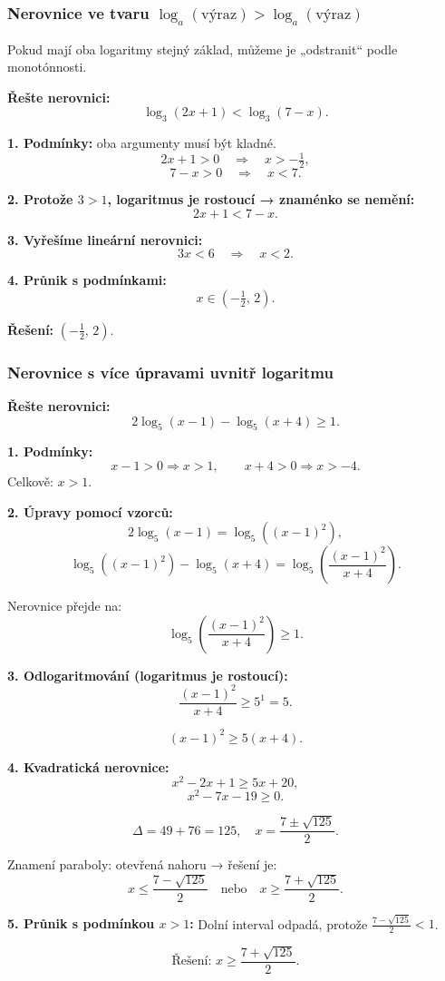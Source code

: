 \documentclass[12pt,a4paper]{article}
\begin{document}
\subsubsection*{Nerovnice ve tvaru $\log_a(\text{výraz}) > \log_a(\text{výraz})$}

Pokud mají oba logaritmy stejný základ, můžeme je „odstranit“ podle monotónnosti.

\begin{examplebox}
\textbf{Řešte nerovnici:}
\[
\log_3(2x+1) < \log_3(7-x).
\]

\textbf{1. Podmínky:} oba argumenty musí být kladné.
\[
2x+1 > 0 \quad\Longrightarrow\quad x > -\tfrac12,
\]
\[
7-x > 0 \quad\Longrightarrow\quad x < 7.
\]

\textbf{2. Protože $3>1$, logaritmus je rostoucí → znaménko se \textbf{nemění}:}
\[
2x+1 < 7 - x.
\]

\textbf{3. Vyřešíme lineární nerovnici:}
\[
3x < 6 \quad\Longrightarrow\quad x < 2.
\]

\textbf{4. Průnik s podmínkami:}
\[
x \in\left(-\tfrac12,\, 2\right).
\]

\textbf{Řešení: } $(-\tfrac12,\, 2)$.
\end{examplebox}


\subsubsection*{Nerovnice s více úpravami uvnitř logaritmu}

\begin{examplebox}
\textbf{Řešte nerovnici:}
\[
2\log_5(x-1) - \log_5(x+4) \ge 1.
\]

\textbf{1. Podmínky:}
\[
x-1 > 0 \Rightarrow x>1,\qquad
x+4>0 \Rightarrow x>-4.
\]
Celkově: $x>1$.

\textbf{2. Úpravy pomocí vzorců:}
\[
2\log_5(x-1) = \log_5((x-1)^2),
\]
\[
\log_5((x-1)^2) - \log_5(x+4)
= \log_5\!\left(\frac{(x-1)^2}{x+4}\right).
\]

Nerovnice přejde na:
\[
\log_5\!\left( \frac{(x-1)^2}{x+4} \right) \ge 1.
\]

\textbf{3. Odlogaritmování (logaritmus je rostoucí):}
\[
\frac{(x-1)^2}{x+4} \ge 5^1 = 5.
\]

\[
(x-1)^2 \ge 5(x+4).
\]

\textbf{4. Kvadratická nerovnice:}
\[
x^2 - 2x + 1 \ge 5x + 20,
\]
\[
x^2 - 7x -19 \ge 0.
\]

\[
\Delta = 49 + 76 = 125,
\quad
x = \frac{7 \pm \sqrt{125}}{2}.
\]

Znamení paraboly: otevřená nahoru → řešení je:
\[
x \le \frac{7 - \sqrt{125}}{2}
\quad\text{nebo}\quad
x \ge \frac{7 + \sqrt{125}}{2}.
\]

\textbf{5. Průnik s podmínkou $x>1$:}
Dolní interval odpadá, protože $\frac{7 - \sqrt{125}}{2} < 1$.

\[
\text{Řešení: } x \ge \frac{7 + \sqrt{125}}{2}.
\]
\end{examplebox}
\end{document}
